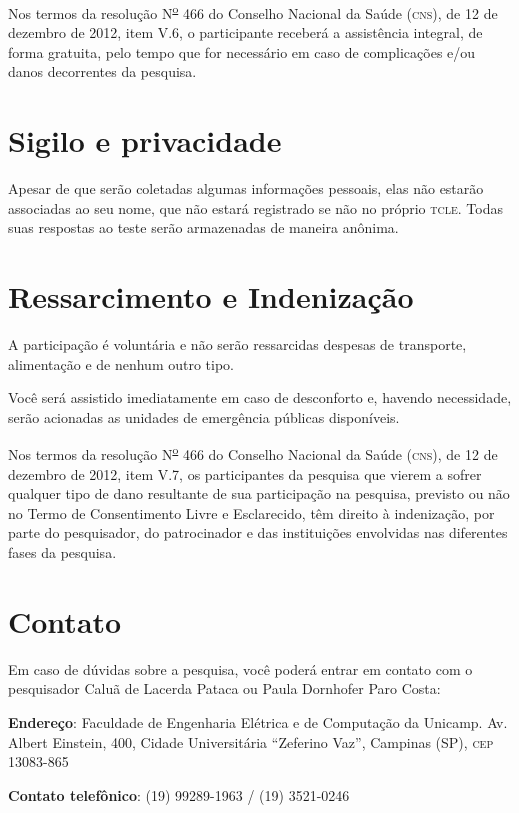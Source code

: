 \documentclass[a4paper,11pt,titlepage,singlespacing]{article}
\begin{document}
Nos termos da resolução N\textsuperscript{\underline{o}} 466 do Conselho Nacional da Saúde (\textsc{cns}), de 12 de dezembro de 2012, item V.6, o participante receberá a assistência integral, de forma gratuita, pelo tempo que for necessário em caso de complicações e/ou danos decorrentes da pesquisa.


\section*{Sigilo e privacidade}

\noindent Apesar de que serão coletadas algumas informações pessoais, elas não estarão associadas ao seu nome, que não estará registrado se não no próprio \textsc{tcle}. Todas suas respostas ao teste serão armazenadas de maneira anônima.

\section*{Ressarcimento e Indenização}

\noindent A participação é voluntária e não serão ressarcidas despesas de transporte, alimentação e de nenhum outro tipo.

Você será assistido imediatamente em caso de desconforto e, havendo necessidade, serão acionadas as unidades de emergência públicas disponíveis. 

Nos termos da resolução N\textsuperscript{\underline{o}} 466 do Conselho Nacional da Saúde (\textsc{cns}), de 12 de dezembro de 2012, item V.7, os participantes da pesquisa que vierem a sofrer qualquer tipo de dano resultante de sua participação na pesquisa, previsto ou não no Termo de Consentimento Livre e Esclarecido, têm direito à indenização, por parte do pesquisador, do patrocinador e das instituições envolvidas nas diferentes fases da pesquisa.

\section*{Contato}

\noindent Em caso de dúvidas sobre a pesquisa, você poderá entrar em contato com o pesquisador Caluã de Lacerda Pataca ou Paula Dornhofer Paro Costa:

\noindent \textbf{Endereço}: Faculdade de Engenharia Elétrica e de Computação da Unicamp. Av. Albert Einstein, 400, Cidade Universitária “Zeferino Vaz”, Campinas (SP), \textsc{cep}
13083-865

\noindent \textbf{Contato telefônico}: (19) 99289-1963 / (19) 3521-0246
\end{document}
